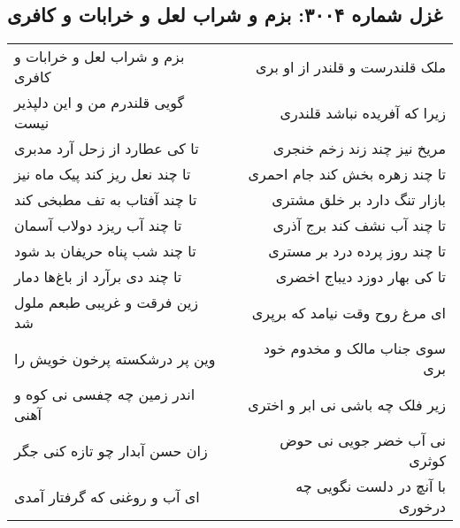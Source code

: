 \begin{center}
\section*{غزل شماره ۳۰۰۴: بزم و شراب لعل و خرابات و کافری}
\label{sec:3004}
\begin{longtable}{l p{0.5cm} r}
بزم و شراب لعل و خرابات و کافری
&&
ملک قلندرست و قلندر از او بری
\\
گویی قلندرم من و این دلپذیر نیست
&&
زیرا که آفریده نباشد قلندری
\\
تا کی عطارد از زحل آرد مدبری
&&
مریخ نیز چند زند زخم خنجری
\\
تا چند نعل ریز کند پیک ماه نیز
&&
تا چند زهره بخش کند جام احمری
\\
تا چند آفتاب به تف مطبخی کند
&&
بازار تنگ دارد بر خلق مشتری
\\
تا چند آب ریزد دولاب آسمان
&&
تا چند آب نشف کند برج آذری
\\
تا چند شب پناه حریفان بد شود
&&
تا چند روز پرده درد بر مستری
\\
تا چند دی برآرد از باغ‌ها دمار
&&
تا کی بهار دوزد دیباج اخضری
\\
زین فرقت و غریبی طبعم ملول شد
&&
ای مرغ روح وقت نیامد که برپری
\\
وین پر درشکسته پرخون خویش را
&&
سوی جناب مالک و مخدوم خود بری
\\
اندر زمین چه چفسی نی کوه و آهنی
&&
زیر فلک چه باشی نی ابر و اختری
\\
زان حسن آبدار چو تازه کنی جگر
&&
نی آب خضر جویی نی حوض کوثری
\\
ای آب و روغنی که گرفتار آمدی
&&
با آنچ در دلست نگویی چه درخوری
\\
\end{longtable}
\end{center}
